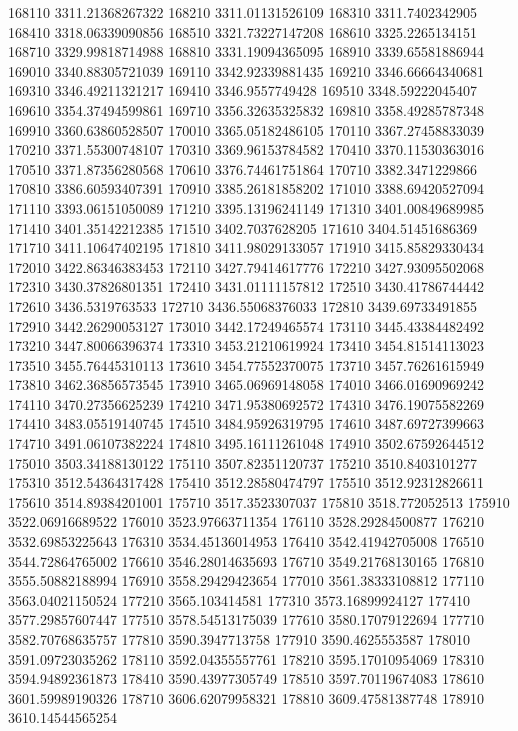 {168110 3311.21368267322
168210 3311.01131526109
168310 3311.7402342905
168410 3318.06339090856
168510 3321.73227147208
168610 3325.2265134151
168710 3329.99818714988
168810 3331.19094365095
168910 3339.65581886944
169010 3340.88305721039
169110 3342.92339881435
169210 3346.66664340681
169310 3346.49211321217
169410 3346.9557749428
169510 3348.59222045407
169610 3354.37494599861
169710 3356.32635325832
169810 3358.49285787348
169910 3360.63860528507
170010 3365.05182486105
170110 3367.27458833039
170210 3371.55300748107
170310 3369.96153784582
170410 3370.11530363016
170510 3371.87356280568
170610 3376.74461751864
170710 3382.3471229866
170810 3386.60593407391
170910 3385.26181858202
171010 3388.69420527094
171110 3393.06151050089
171210 3395.13196241149
171310 3401.00849689985
171410 3401.35142212385
171510 3402.7037628205
171610 3404.51451686369
171710 3411.10647402195
171810 3411.98029133057
171910 3415.85829330434
172010 3422.86346383453
172110 3427.79414617776
172210 3427.93095502068
172310 3430.37826801351
172410 3431.01111157812
172510 3430.41786744442
172610 3436.5319763533
172710 3436.55068376033
172810 3439.69733491855
172910 3442.26290053127
173010 3442.17249465574
173110 3445.43384482492
173210 3447.80066396374
173310 3453.21210619924
173410 3454.81514113023
173510 3455.76445310113
173610 3454.77552370075
173710 3457.76261615949
173810 3462.36856573545
173910 3465.06969148058
174010 3466.01690969242
174110 3470.27356625239
174210 3471.95380692572
174310 3476.19075582269
174410 3483.05519140745
174510 3484.95926319795
174610 3487.69727399663
174710 3491.06107382224
174810 3495.16111261048
174910 3502.67592644512
175010 3503.34188130122
175110 3507.82351120737
175210 3510.8403101277
175310 3512.54364317428
175410 3512.28580474797
175510 3512.92312826611
175610 3514.89384201001
175710 3517.3523307037
175810 3518.772052513
175910 3522.06916689522
176010 3523.97663711354
176110 3528.29284500877
176210 3532.69853225643
176310 3534.45136014953
176410 3542.41942705008
176510 3544.72864765002
176610 3546.28014635693
176710 3549.21768130165
176810 3555.50882188994
176910 3558.29429423654
177010 3561.38333108812
177110 3563.04021150524
177210 3565.103414581
177310 3573.16899924127
177410 3577.29857607447
177510 3578.54513175039
177610 3580.17079122694
177710 3582.70768635757
177810 3590.3947713758
177910 3590.4625553587
178010 3591.09723035262
178110 3592.04355557761
178210 3595.17010954069
178310 3594.94892361873
178410 3590.43977305749
178510 3597.70119674083
178610 3601.59989190326
178710 3606.62079958321
178810 3609.47581387748
178910 3610.14544565254
}
